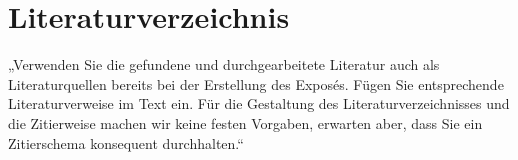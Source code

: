 

\section{Literaturverzeichnis}
\label{sec:literaturverzeichnis}



„Verwenden Sie die gefundene und durchgearbeitete Literatur auch als
Literaturquellen bereits bei der Erstellung des Exposés. Fügen Sie
entsprechende Literaturverweise im Text ein. Für die Gestaltung des
Literaturverzeichnisses und die Zitierweise machen wir keine festen
Vorgaben, erwarten aber, dass Sie ein Zitierschema konsequent
durchhalten.“


